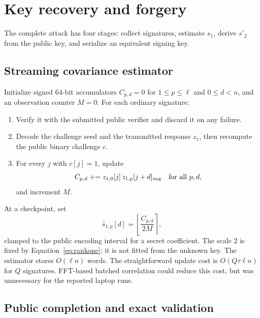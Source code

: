 \documentclass[11pt,a4paper]{article}
\newcommand{\round}[1]{\left\lfloor #1\right\rceil}
\begin{document}
\section{Key recovery and forgery}
\label{sec:attack}

The complete attack has four stages: collect signatures, estimate $s_1$,
derive $s'_2$ from the public key, and serialize an equivalent signing key.

\subsection{Streaming covariance estimator}

Initialize signed 64-bit accumulators $C_{p,d}=0$ for
$1\le p\le\ell$ and $0\le d<n$, and an observation counter $M=0$.
For each ordinary signature:

\begin{enumerate}[leftmargin=2em]
  \item Verify it with the submitted public verifier and discard it on any
        failure.
  \item Decode the challenge seed and the transmitted response $z_1$, then
        recompute the public binary challenge $c$.
  \item For every $j$ with $c[j]=1$, update
        \begin{equation}
          C_{p,d}\mathrel{+}=z_{1,0}[j]\,
                      z_{1,p}[j+d]_{\rm neg}
          \quad\text{for all }p,d,
        \label{eq:update}
        \end{equation}
        and increment $M$.
\end{enumerate}

At a checkpoint, set
\begin{equation}
             \widehat s_{1,p}[d]
               =\round{\frac{C_{p,d}}{2M}},
\label{eq:estimator}
\end{equation}
clamped to the public encoding interval for a secret coefficient.  The scale
$2$ is fixed by Equation~\eqref{eq:rankone}; it is not fitted from the unknown
key.  The estimator stores $O(\ell n)$ words.  The straightforward update
cost is $O(Q\tau\ell n)$ for $Q$ signatures.  FFT-based batched correlation
could reduce this cost, but was unnecessary for the reported laptop runs.

\subsection{Public completion and exact validation}
\end{document}
